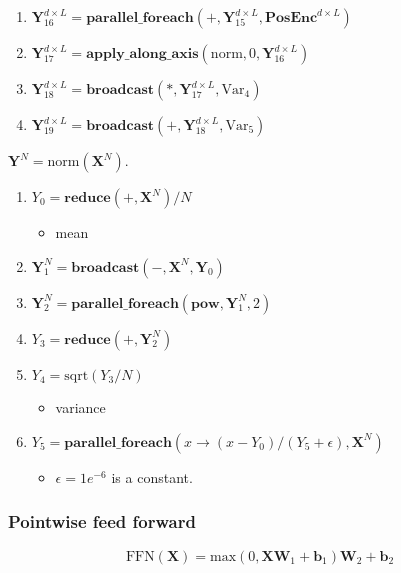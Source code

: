 \begin{enumerate}
  \item $\mathbf{Y}_{16}^{d \times L} = \textbf{parallel\_foreach}(+, \mathbf{Y}_{15}^{d \times L}, \textbf{PosEnc}^{d \times L})$
  \item $\mathbf{Y}_{17}^{d \times L} = \textbf{apply\_along\_axis}(\text{norm},0,\mathbf{Y}_{16}^{d \times L})$
  \item $\mathbf{Y}_{18}^{d \times L} = \textbf{broadcast}(*, \mathbf{Y}_{17}^{d \times L}, \text{Var}_4)$
  \item $\mathbf{Y}_{19}^{d \times L} = \textbf{broadcast}(+, \mathbf{Y}_{18}^{d \times L}, \text{Var}_5)$
\end{enumerate}

\begin{info}

$\mathbf{Y}^{N} = \text{norm}(\mathbf{X}^N)$.
\begin{enumerate}
  \item $Y_0 = \textbf{reduce}(+, \mathbf{X}^N) / N$
  \begin{itemize}
    \item mean
  \end{itemize}
  \item $\textbf{Y}_1^{N} = \textbf{broadcast}(-, \mathbf{X}^{N},\textbf{Y}_0)$
  \item $\textbf{Y}_2^{N} = \textbf{parallel\_foreach}(\textbf{pow}, \mathbf{Y}_1^{N}, 2)$
  \item $Y_3 = \textbf{reduce}(+, \mathbf{Y}_2^N)$
  \item $Y_4 = \text{sqrt}(Y_3 / N)$
  \begin{itemize}
    \item variance
  \end{itemize}
  \item $Y_5 = \textbf{parallel\_foreach}(x \rightarrow (x-Y_0)/(Y_5 + \epsilon),\mathbf{X}^N)$
\begin{itemize}
  \item $\epsilon = 1e^{-6}$ is a constant.
\end{itemize}
\end{enumerate}
\end{info}

\subsubsection{Pointwise feed forward}

$$\text{FFN}(\mathbf{X}) = \text{max}(0, \mathbf{X}\mathbf{W}_1 + \mathbf{b}_1)\mathbf{W}_2 + \mathbf{b}_2$$

